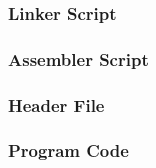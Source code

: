 \subsubsection{Linker Script}
\label{subsec:LinkerRef}



\pagebreak

\subsubsection{Assembler Script}
\label{subsec:AssemblerRef}



\pagebreak

\subsubsection{Header File}
\label{subsec:HeaderRef}



\pagebreak

\subsubsection{Program Code}
\label{sec:ProgCodeRef}


